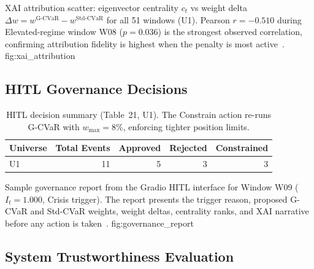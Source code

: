   {XAI attribution scatter: eigenvector centrality $c_t$ vs weight
   delta $\Delta w = w^{\text{G-CVaR}} - w^{\text{Std-CVaR}}$ for
   all 51 windows (U1). Pearson $r = -0.510$ during Elevated-regime
   window W08 ($p = 0.036$) is the strongest observed correlation,
   confirming attribution fidelity is highest when the penalty is
   most active~\citep{bonacich1987,arrieta2020}.}
  {fig:xai_attribution}

\subsection{HITL Governance Decisions}

\begin{table}[H]
\centering
\caption{HITL decision summary (Table~21, U1). The Constrain action
         re-runs G-CVaR with $w_{\max} = 8\%$, enforcing tighter
         position limits.}
\label{tab:hitl_summary}
\begin{tabular}{lrrrr}
\toprule
Universe & Total Events & Approved & Rejected & Constrained \\
\midrule
U1 & 11 & 5 & 3 & 3 \\
\bottomrule
\end{tabular}
\end{table}

  {Sample governance report from the Gradio HITL interface for
   Window W09 ($I_t = 1.000$, Crisis trigger). The report presents
   the trigger reason, proposed G-CVaR and Std-CVaR weights,
   weight deltas, centrality ranks, and XAI narrative before any
   action is taken~\citep{holzinger2016,cai2019}.}
  {fig:governance_report}

\subsection{System Trustworthiness Evaluation}

